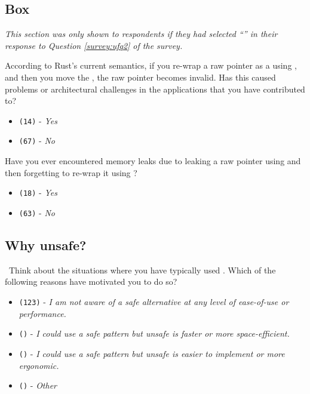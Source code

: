 \subsection{Box}
\label{survey:sec:bxq}
\textit{This section was only shown to respondents if they had selected ``'' in their response to Question \ref{survey:ufq2} of the survey.}
\begin{protocol}
\item \label{survey:bxq1} According to Rust's current semantics, if you re-wrap a raw pointer as a  using , and then you move the , the raw pointer becomes invalid. Has this caused problems or architectural challenges in the applications that you have contributed to?
\begin{itemize}
\item \texttt{(14)} - \textit{Yes}
\item \texttt{(67)} - \textit{No}
\end{itemize}
\item \label{survey:bxq2} Have you ever encountered memory leaks due to leaking a raw pointer using  and then forgetting to re-wrap it using ?
\begin{itemize}
\item \texttt{(18)} - \textit{Yes}
\item \texttt{(63)} - \textit{No}
\end{itemize}
\end{protocol}

\subsection{Why unsafe?}
\label{survey:sec:wuq}

\begin{protocol}
\item \label{survey:wuq1}  \ Think about the situations where you have typically used \unsafe. Which of the following reasons have motivated you to do so?
\begin{itemize}
\item \texttt{(123)} - \textit{I am not aware of a safe alternative at any level of ease-of-use or performance.}
\item \texttt{()} - \textit{I could use a safe pattern but unsafe is faster or more space-efficient.}
\item \texttt{()} - \textit{I could use a safe pattern but unsafe is easier to implement or more ergonomic.}
\item \texttt{()} - \textit{Other}
\end{itemize}
\end{protocol}

